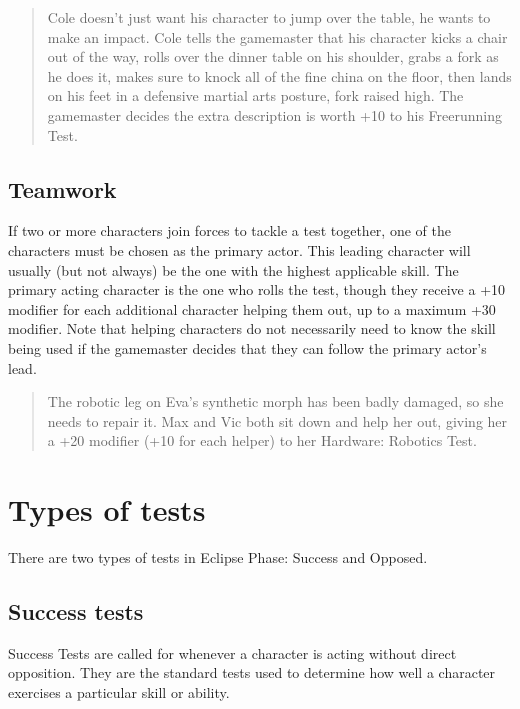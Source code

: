 \begin{quotation}
  Cole doesn't just want his character to jump over the table, he
  wants to make an impact. Cole tells the gamemaster that his
  character kicks a chair out of the way, rolls over the dinner table
  on his shoulder, grabs a fork as he does it, makes sure to knock all
  of the fine china on the floor, then lands on his feet in a
  defensive martial arts posture, fork raised high. The gamemaster
  decides the extra description is worth +10 to his Freerunning Test.
\end{quotation}

\subsection{Teamwork}
\label{sec:teamwork}

If two or more characters join forces to tackle a test together, one
of the characters must be chosen as the primary actor. This leading
character will usually (but not always) be the one with the highest
applicable skill. The primary acting character is the one who rolls
the test, though they receive a +10 modifier for each additional
character helping them out, up to a maximum +30 modifier. Note that
helping characters do not necessarily need to know the skill being
used if the gamemaster decides that they can follow the primary
actor's lead.

\begin{quotation}
  The robotic leg on Eva's synthetic morph has been badly damaged, so
  she needs to repair it. Max and Vic both sit down and help her out,
  giving her a +20 modifier (+10 for each helper) to her Hardware:
  Robotics Test.
\end{quotation}

\section{Types of tests}
\label{sec:types-tests}

There are two types of tests in Eclipse Phase: Success and Opposed.

\subsection{Success tests}
\label{sec:success-tests}

Success Tests are called for whenever a character is acting without
direct opposition. They are the standard tests used to determine how
well a character exercises a particular skill or ability.

